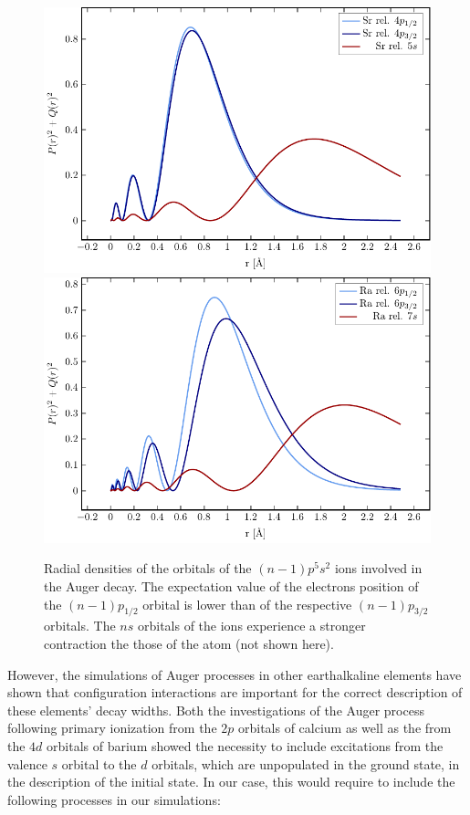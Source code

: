 \begin{figure}[h]
 \centering
 \includegraphics[width=\columnwidth]{pics/sr_ion_R.pdf}\\
 \includegraphics[width=\columnwidth]{pics/ra_ion_R.pdf}\\
 \caption{Radial densities of the orbitals of the $(n-1)p^5s^2$ ions
          involved in the Auger decay.
          The expectation value of the electrons position of the $(n-1)p_{1/2}$
          orbital is lower than of the respective $(n-1)p_{3/2}$
          orbitals. The $ns$ orbitals of the ions experience a stronger
          contraction the those of the atom (not shown here).}
 \label{fig:radial_pure}
\end{figure}

However, the simulations of Auger processes in other earthalkaline elements
have shown that configuration interactions are important for the correct
description of these elements' decay widths. Both the investigations of
the Auger process following primary ionization
from the $2p$ orbitals of calcium \cite{}
as well as the from the $4d$ orbitals of barium \cite{}
showed the necessity to include excitations from the valence $s$ orbital to
the $d$ orbitals, which are unpopulated in the ground state, in the
description of the initial state.
In our case, this would require to include the following processes in our
simulations:

